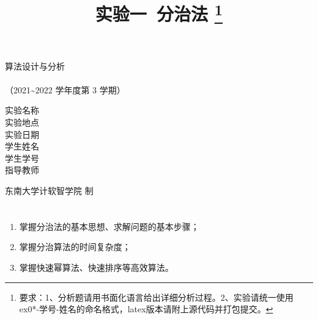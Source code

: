 \documentclass[12pt,a4paper]{ctexart}
\begin{document}
    \begin{titlepage}
        \heiti
        \vspace*{64pt}
        \begin{center}
            \fontsize{48pt}{0} 算法设计与分析\\
            \vspace*{36pt}
            \\
            \vspace*{48pt}
            \LARGE（2021\~{}2022 学年度\qquad 第 3 学期）\\
            \vspace*{48pt}
        
            \LARGE 实验名称\ \ \underline{\makebox[200pt]{\ExamTitle}}\\
            \LARGE 实验地点\ \ \underline{\makebox[200pt]{\ExamAddr}}\\
            \LARGE 实验日期\ \ \underline{\makebox[200pt]{\today}}\\
            \LARGE 学生姓名\ \ \underline{\makebox[200pt]{\MyName}}\\
            \LARGE 学生学号\ \ \underline{\makebox[200pt]{\MySID}}\\
            \LARGE 指导教师\ \ \underline{\makebox[200pt]{\TeacherName}}\\
            \vspace*{48pt}
            
            \LARGE 东南大学\quad  计软智学院 \quad 制
        \end{center}
    \end{titlepage}

\title{
  {\heiti \textbf{实验一\ 分治法}
    \footnote{要求：1、分析题请用书面化语言给出详细分析过程。2、实验请统一使用ex0*-学号-姓名的命名格式，latex版本请附上源代码并打包提交。}
    }
}
\date{}

\maketitle

\section*{\bf \color{black}{一、实验目的及意义}}
\noindent
\begin{enumerate}
	\item[(1)]  掌握分治法的基本思想、求解问题的基本步骤；
	\item[(2)]  掌握分治算法的时间复杂度；
	\item[(3)]  掌握快速幂算法、快速排序等高效算法。
\end{enumerate}
\end{document}
